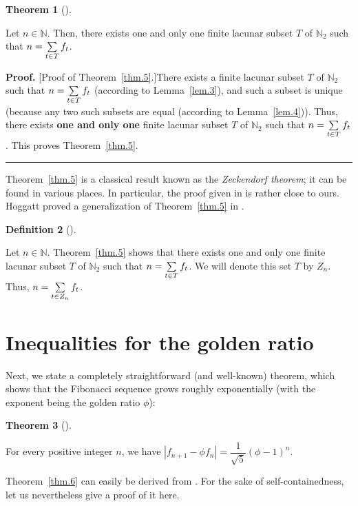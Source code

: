\documentclass[numbers=enddot,12pt,final,onecolumn,notitlepage]{scrartcl}%
\numberwithin{exer}{section}
\theoremstyle{definition}
\newtheorem{theo}{Theorem}[section]
\newenvironment{theorem}[1][]
{\begin{theo}[#1]\begin{leftbar}}
{\end{leftbar}\end{theo}}
\newtheorem{defi}[theo]{Definition}
\newenvironment{definition}[1][]
{\begin{defi}[#1]\begin{leftbar}}
{\end{leftbar}\end{defi}}
\newenvironment{proof}[1][Proof]{\noindent\textbf{#1.} }{\ \rule{0.5em}{0.5em}}
\let\sumnonlimits\sum
\renewcommand{\sum}{\sumnonlimits\limits}
\begin{document}
\begin{theorem}
[Zeckendorf theorem]\label{thm.5} Let $n \in\mathbb{N}$. Then, there exists
one and only one finite lacunar subset $T$ of $\mathbb{N}_{2}$ such that
$n=\sum\limits_{t\in T}f_{t}$.
\end{theorem}

\begin{proof}
[Proof of Theorem~\ref{thm.5}.]There exists a finite lacunar subset $T$ of
$\mathbb{N}_{2}$ such that $n=\sum\limits_{t\in T}f_{t}$ (according to
Lemma~\ref{lem.3}), and such a subset is unique (because any two such subsets
are equal (according to Lemma~\ref{lem.4})). Thus, there exists \textbf{one
and only one} finite lacunar subset $T$ of $\mathbb{N}_{2}$ such that
$n=\sum\limits_{t\in T}f_{t}$. This proves Theorem~\ref{thm.5}.
\end{proof}

Theorem~\ref{thm.5} is a classical result known as the \textit{Zeckendorf
theorem}; it can be found in various places. In particular, the proof given in
\cite{Hender16} is rather close to ours. Hoggatt proved a generalization of
Theorem~\ref{thm.5} in \cite{Hoggat72}.

\begin{definition}
Let $n\in\mathbb{N}$. Theorem~\ref{thm.5} shows that there exists one and only
one finite lacunar subset $T$ of $\mathbb{N}_{2}$ such that $n=\sum
\limits_{t\in T}f_{t}$. We will denote this set $T$ by $Z_{n}$. Thus,
$n=\sum\limits_{t\in Z_{n}}f_{t}$.
\end{definition}

\section{Inequalities for the golden ratio}

Next, we state a completely straightforward (and well-known) theorem, which
shows that the Fibonacci sequence grows roughly exponentially (with the
exponent being the golden ratio $\phi$):

\begin{theorem}
\label{thm.6} For every positive integer $n$, we have $\left\vert f_{n+1}-\phi
f_{n}\right\vert =\dfrac{1}{\sqrt{5}}\left(  \phi-1\right)  ^{n}$.
\end{theorem}

Theorem~\ref{thm.6} can easily be derived from \cite[Chapter 9, Corollary
34]{BenQui03}. For the sake of self-containedness, let us nevertheless give a
proof of it here.
\end{document}
